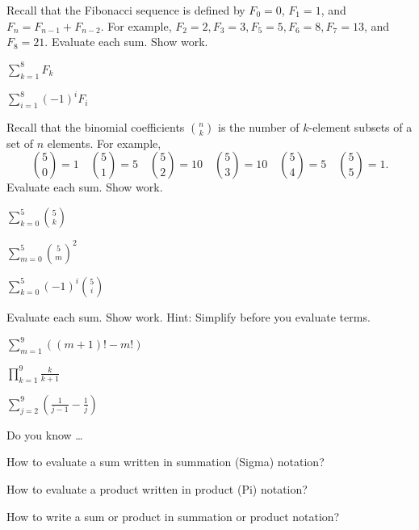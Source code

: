 \begin{exer}[\exerU] %
\label{exer_eval_fib_sums}
    Recall that the Fibonacci sequence is defined by $F_0=0$, $F_1=1$, and $F_n=F_{n-1}+F_{n-2}$.  For example, $F_2=2, F_3=3, F_5=5, F_6=8, F_7=13$, and $F_8=21$.
    Evaluate each sum. Show work. 
        \begin{exerpart}
            \item $\displaystyle \sum_{k=1}^8F_k$
            \item $\displaystyle \sum _{i=1}^8(-1)^iF_{i}$
        \end{exerpart}
\end{exer}

\begin{exer}[\exerU] %
\label{exer_eval_binom_sum}
    Recall that the binomial coefficients $\binom{n}{k}$ is the number of $k$-element subsets of a set of $n$ elements.  For example, 
        $$\binom{5}{0} = 1 \quad 
        \binom{5}{1} = 5 \quad
        \binom{5}{2} = 10 \quad
        \binom{5}{3} = 10 \quad
        \binom{5}{4} = 5 \quad
        \binom{5}{5} = 1.$$
    Evaluate each sum. Show work.
        \begin{exerpart}
            \item $\displaystyle \sum_{k=0}^5 \binom{5}{k}$
            \item $\displaystyle \sum_{m=0}^5 \binom{5}{m}^2$
            \item $\displaystyle \sum_{k=0}^5 (-1)^i\binom{5}{i}$
        \end{exerpart}
\end{exer}

\begin{exer}[\exerU] %
\label{exer_eval_telescoping}
    Evaluate each sum. Show work.  Hint: Simplify before you evaluate terms.
        \begin{exerpart}
            \item $\displaystyle \sum_{m=1}^9 \left((m+1)!-m!\right)$
            \item $\displaystyle \prod_{k=1}^9 \frac{k}{k+1}$
            \item $\displaystyle \sum_{j=2}^9 \left(\frac{1}{j-1}-\frac{1}{j}\right)$
        \end{exerpart}
\end{exer}

\begin{exer}[\exerR] %
\label{exer_dyk_sigma_pi}
    Do you know \ldots
        \begin{exerpart}
            \item How to evaluate a sum written in summation (Sigma) notation?
            \item How to evaluate a product written in product (Pi) notation?
            \item How to write a sum or product in summation or product notation?
        \end{exerpart}
\end{exer} 

